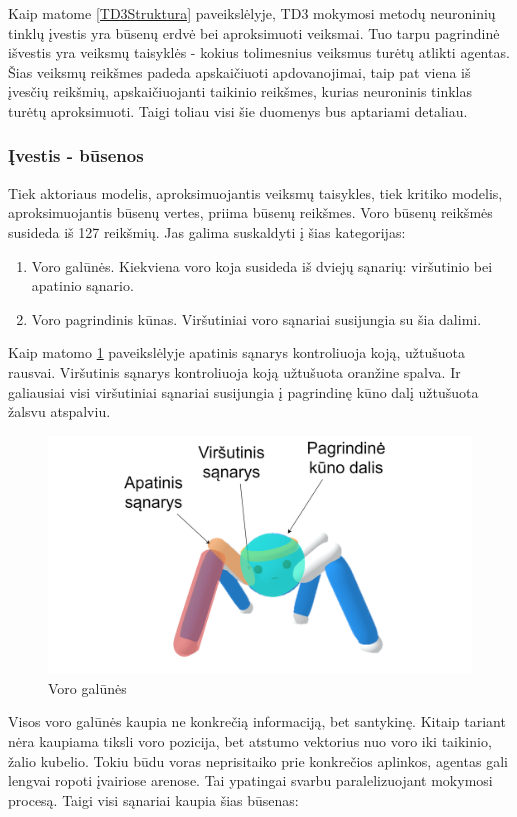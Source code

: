 \documentclass[a4paper, 12pt]{article}
\begin{document}
Kaip matome \ref{TD3Struktura} paveikslėlyje, TD3 mokymosi metodų neuroninių tinklų įvestis yra būsenų erdvė bei aproksimuoti veiksmai. Tuo tarpu pagrindinė išvestis yra veiksmų taisyklės - kokius tolimesnius veiksmus turėtų atlikti agentas. Šias veiksmų reikšmes padeda apskaičiuoti apdovanojimai, taip pat viena iš įvesčių reikšmių, apskaičiuojanti taikinio reikšmes, kurias neuroninis tinklas turėtų aproksimuoti. Taigi toliau visi šie duomenys bus aptariami detaliau.

\subsubsection{Įvestis - būsenos}

Tiek aktoriaus modelis, aproksimuojantis veiksmų taisykles, tiek kritiko modelis, aproksimuojantis būsenų vertes, priima būsenų reikšmes. Voro būsenų reikšmės susideda iš 127 reikšmių. Jas galima suskaldyti į šias kategorijas:

\begin{enumerate}
  \addtolength{\itemsep}{-0.5\baselineskip} 
  \item Voro galūnės. Kiekviena voro koja susideda iš dviejų sąnarių: viršutinio bei apatinio sąnario.
  \item Voro pagrindinis kūnas. Viršutiniai voro sąnariai susijungia su šia dalimi.
\end{enumerate}

Kaip matomo \ref{VoroGalunes} paveikslėlyje apatinis sąnarys kontroliuoja koją, užtušuota rausvai. Viršutinis sąnarys kontroliuoja koją užtušuota oranžine spalva. Ir galiausiai visi viršutiniai sąnariai susijungia į pagrindinę kūno dalį užtušuota žalsvu atspalviu.

\begin{figure}[h!]
\centering
\includegraphics[width=.7\textwidth]{VoroGalunes}
\caption{Voro galūnės}
\label{VoroGalunes}
\end{figure}

Visos voro galūnės kaupia ne konkrečią informaciją, bet santykinę. Kitaip tariant nėra kaupiama tiksli voro pozicija, bet atstumo vektorius nuo voro iki taikinio, žalio kubelio. Tokiu būdu voras neprisitaiko prie konkrečios aplinkos, agentas gali lengvai ropoti įvairiose arenose. Tai ypatingai svarbu paralelizuojant mokymosi procesą. Taigi visi sąnariai kaupia šias būsenas:
\end{document}
